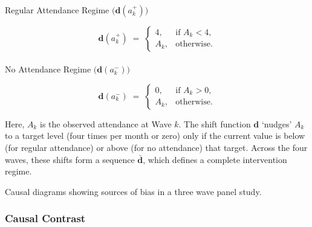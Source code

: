 \documentclass[
  single column]{article}
\makeatletter
\let\oldparagraph\paragraph
\renewcommand{\paragraph}{
    \@ifstar
      \xxxParagraphStar
      \xxxParagraphNoStar
  }
\newcommand{\xxxParagraphStar}[1]{\oldparagraph*{#1}\mbox{}}
\newcommand{\xxxParagraphNoStar}[1]{\oldparagraph{#1}\mbox{}}
\makeatother
\begin{document}
\paragraph{\texorpdfstring{Regular Attendance Regime
\(\bigl(\boldsymbol{d}(a_k^+)\bigr)\)}{Regular Attendance Regime \textbackslash bigl(\textbackslash boldsymbol\{d\}(a\_k\^{}+)\textbackslash bigr)}}\label{regular-attendance-regime-biglboldsymbolda_kbigr}

\[
\boldsymbol{d}(a_k^+) 
\;=\; 
\begin{cases}
4, & \text{if } A_k < 4,\\[6pt]
A_k, & \text{otherwise.}
\end{cases}
\]

\paragraph{\texorpdfstring{No Attendance Regime
\(\bigl(\boldsymbol{d}(a_k^-)\bigr)\)}{No Attendance Regime \textbackslash bigl(\textbackslash boldsymbol\{d\}(a\_k\^{}-)\textbackslash bigr)}}\label{no-attendance-regime-biglboldsymbolda_k-bigr}

\[
\boldsymbol{d}(a_k^-) 
\;=\; 
\begin{cases}
0, & \text{if } A_k > 0,\\[6pt]
A_k, & \text{otherwise.}
\end{cases}
\]

Here, \(A_k\) is the observed attendance at Wave \(k\). The shift
function \(\boldsymbol{d}\) `nudges' \(A_k\) to a target level (four
times per month or zero) only if the current value is below (for regular
attendance) or above (for no attendance) that target. Across the four
waves, these shifts form a sequence \(\boldsymbol{\bar{d}}\), which
defines a complete intervention regime.

\begin{table}

\caption{\label{tbl-intervention}Causal diagrams showing sources of bias
in a three wave panel study.}

\centering{

\tvtable

}

\end{table}%

\subsubsection{Causal Contrast}\label{causal-contrast}
\end{document}
